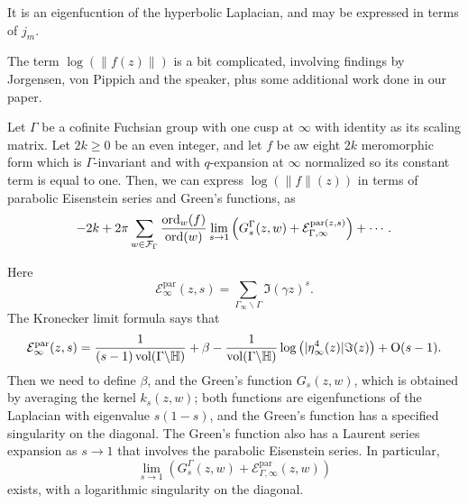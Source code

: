 \documentclass[reqno]{amsart} 
\begin{document}
It is an eigenfucntion of the hyperbolic Laplacian, and may be expressed in terms of $j_m$.

The term $\log \left( \lVert f(z) \rVert \right)$ is a bit complicated, involving findings by Jorgensen, von Pippich and the speaker, plus some additional work done in our paper.

\begin{proposition}
  Let $\Gamma$ be a cofinite Fuchsian group with one cusp at $\infty$ with identity as its scaling matrix.  Let $2 k \geq 0$ be an even integer, and let $f$ be aw eight $2 k$ meromorphic form which is $\Gamma$-invariant and with $q$-expansion at $\infty$ normalized so its constant term is equal to one.  Then, we can express $\log \left( \lVert f \rVert(z) \right)$ in terms of parabolic Eisenstein series and Green's functions, as
  \begin{equation*}
    - 2 k + 2 \pi \sum_{w \in \mathcal{F}_\Gamma}
    \frac{\operatorname{ord}_w(f)}{ \operatorname{ord}(w)} \lim_{s \rightarrow 1} \left( G_s^\Gamma(z, w) + \mathcal{E}_{\Gamma, \infty}^{\mathrm{par}(z, s)} \right)
    + \dotsb.
  \end{equation*}
\end{proposition}

Here
\begin{equation*}
  \mathcal{E}_\infty^{\mathrm{par}}(z, s) = \sum_{\Gamma_\infty \backslash \Gamma} \Im(\gamma z)^s.
\end{equation*}
The Kronecker limit formula says that
\begin{equation*}
  \mathcal{E}_\infty^{\mathrm{par}}(z, s) = \frac{1}{(s-1) \operatorname{vol}(\Gamma \backslash \mathbb{H})}
  + \beta - \frac{1}{\operatorname{vol}(\Gamma \backslash \mathbb{H})}
  \log \left( \lvert \eta_\infty^4(z) \rvert \Im(z) \right)
  + \operatorname{O}(s - 1).
\end{equation*}
Then we need to define $\beta$, and the Green's function $G_s(z, w)$, which is obtained by averaging the kernel $k_s(z, w)$; both functions are eigenfunctions of the Laplacian with eigenvalue $s(1 - s)$, and the Green's function has a specified singularity on the diagonal.  The Green's function also has a Laurent series expansion as $s \rightarrow 1$ that involves the parabolic Eisenstein series.  In particular,
\begin{equation*}
  \lim_{s \rightarrow 1} \left( G_s^\Gamma(z, w) + \mathcal{E}_{\Gamma, \infty}^{\mathrm{par}}(z, w) \right)
\end{equation*}
exists, with a logarithmic singularity on the diagonal.
\end{document}
